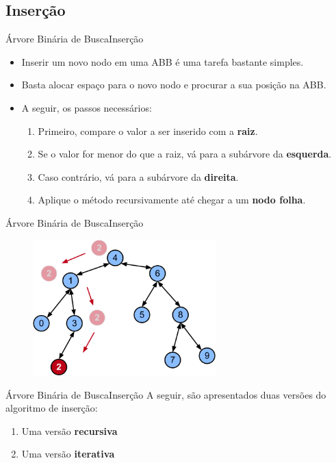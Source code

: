\documentclass[aspectratio=169]{beamer}
\begin{document}
\subsection{Inserção}

\begin{frame}{Árvore Binária de Busca}{Inserção}
\begin{itemize}
 \item Inserir um novo nodo em uma ABB é uma tarefa bastante simples.
 \item Basta alocar espaço para o novo nodo e procurar a sua posição na ABB.
 \item A seguir, os passos necessários:
 \begin{enumerate}
  \item Primeiro, compare o valor a ser inserido com a {\bf raiz}.
  \item Se o valor for menor do que a raiz, vá para a subárvore da {\bf esquerda}.
  \item Caso contrário, vá para a subárvore da {\bf direita}.
  \item Aplique o método recursivamente até chegar a um {\bf nodo folha}.
 \end{enumerate}
\end{itemize}
\end{frame}


\begin{frame}{Árvore Binária de Busca}{Inserção}
\begin{figure}[!h]
  \centering
  \includegraphics[width=200pt]{imagens/insercao1.png}
  \label{fig_insercao}
\end{figure}
\end{frame}


\begin{frame}{Árvore Binária de Busca}{Inserção}
A seguir, são apresentados duas versões do algoritmo de inserção:
\begin{enumerate}
 \item Uma versão {\bf recursiva}
 \item Uma versão {\bf iterativa}
\end{enumerate}
\end{frame}
\end{document}
